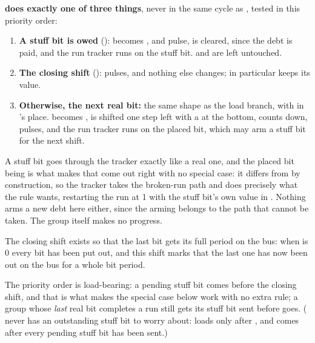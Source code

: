 \textbf{ does exactly one of three things}, never in the same cycle as ,
tested in this priority order:
\begin{enumerate}
  \item \textbf{A stuff bit is owed} ():  becomes
    ,  and  pulse,  is cleared,
    since the debt is paid, and the run tracker runs on the stuff bit.  and
     are left untouched.
  \item \textbf{The closing shift} ():  pulses, and nothing else
    changes;  in particular keeps its value.
  \item \textbf{Otherwise, the next real bit:} the same shape as the load branch, with
     in 's place.  becomes ,
     is shifted one step left with a  at the bottom, 
    counts down,  pulses, and the run tracker runs on the placed bit, which may arm a
    stuff bit for the next shift.
\end{enumerate}

A stuff bit goes through the tracker exactly like a real one, and the placed bit being
 is what makes that come out right with no special case: it differs from
 by construction, so the tracker takes the broken-run path and does precisely what the
rule wants, restarting the run at 1 with the stuff bit's own value in . Nothing arms a
new debt here either, since the arming belongs to the path that cannot be taken. The group itself
makes no progress.

The closing shift exists so that the last bit gets its full period on the bus: when 
is 0 every bit has been put out, and this shift marks that the last one has now been out on the bus
for a whole bit period.

The priority order is load-bearing: a pending stuff bit comes before the closing shift, and that is
what makes the special case below work with no extra rule; a group whose \emph{last} real bit
completes a run still gets its stuff bit sent before  goes. ( never has an
outstanding stuff bit to worry about:  loads only after , and
 comes after every pending stuff bit has been sent.)

